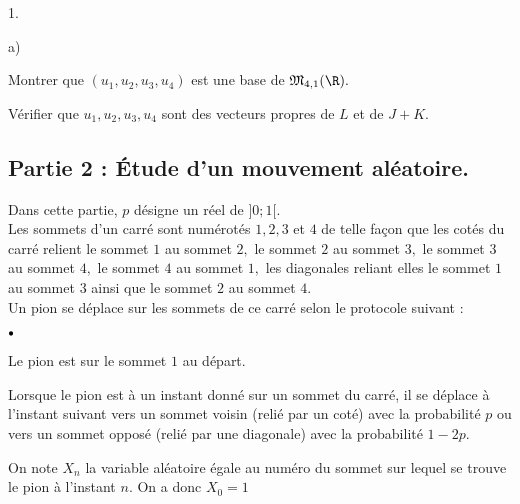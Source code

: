 \documentclass[11pt]{article}%
\begin{document}
\begin{noliste}{1.}
\begin{noliste}{a)}
 \setlength{\itemsep}{2mm}
\item Montrer que $(u_{1},u_{2},u_{3},u_{4})$ est une base de
$\mathfrak{M}_{4,1}(\R).$

\item Vérifier que $u_{1},u_{2},u_{3},u_{4}$ sont des vecteurs propres
de $L$ et de $J + K.${\Large }
\end{noliste}
\end{noliste}

\subsection*{Partie 2 : Étude d'un mouvement aléatoire.}

Dans cette partie, $p$ désigne un réel de $]0;1[.$\\
Les sommets d'un carré sont numérotés $1,2,3$ et $4$ de telle façon que
les
cotés du carré relient le sommet $1$ au sommet $2,$ le sommet $2$ au
sommet $
3,$ le sommet $3$ au sommet $4,$ le sommet $4$ au sommet $1,$ les
diagonales
reliant elles le sommet $1$ au sommet $3$ ainsi que le sommet $2$ au
sommet $
4.$\\
Un pion se déplace sur les sommets de ce carré selon le protocole
suivant :

\begin{noliste}{$\scriptstyle \bullet$}
\item Le pion est sur le sommet $1$ au départ.

\item Lorsque le pion est à un instant donné sur un sommet du carré, il
se déplace à l'instant suivant vers un sommet voisin (relié par un
coté) avec la
probabilité $p$ ou vers un sommet opposé (relié par une diagonale) avec
la
probabilité $1-2p.$
\end{noliste}

\noindent On note $X_{n}$ la variable aléatoire égale au numéro du
sommet
sur lequel se trouve le pion à l'instant $n.$ On a donc $X_{0} = 1$
\end{document}
